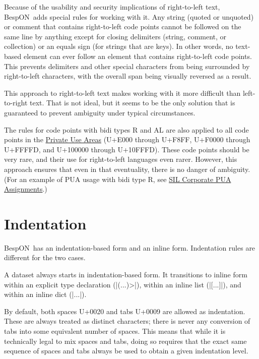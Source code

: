 \documentclass[11pt]{article}
\newcommand{\bespon}{BespON}
\begin{document}
Because of the usability and security implications of right-to-left text, \bespon\ adds special rules for working with it.  Any string (quoted or unquoted) or comment that contains right-to-left code points cannot be followed on the same line by anything except for closing delimiters (string, comment, or collection) or an equals sign (for strings that are keys).  In other words, no text-based element can ever follow an element that contains right-to-left code points.  This prevents delimiters and other special characters from being surrounded by right-to-left characters, with the overall span being visually reversed as a result.

This approach to right-to-left text makes working with it more difficult than left-to-right text.  That is not ideal, but it seems to be the only solution that is guaranteed to prevent ambiguity under typical circumstances.

The rules for code points with bidi types R and AL are also applied to all code points in the \href{http://www.unicode.org/faq/private_use.html}{Private Use Areas} (U+E000 through U+F8FF, U+F0000 through U+FFFFD, and U+100000 through  U+10FFFD).  These code points should be very rare, and their use for right-to-left languages even rarer.  However, this approach ensures that even in that eventuality, there is no danger of ambiguity.  (For an example of PUA usage with bidi type R, see \href{http://scripts.sil.org/cms/scripts/page.php?item_id=SILPUAassignments}{SIL Corporate PUA Assignments}.)







\section{Indentation}
\label{sec:indentation}

\bespon\ has an indentation-based form and an inline form.  Indentation rules are different for the two cases.

A dataset always starts in indentation-based form.  It transitions to inline form within an explicit type declaration (|(...)>|), within an inline list (|[...]|), and within an inline dict (|{...}|).

By default, both spaces U+0020 and tabs U+0009 are allowed as indentation.  These are always treated as distinct characters; there is never any conversion of tabs into some equivalent number of spaces.  This means that while it is technically legal to mix spaces and tabs, doing so requires that the exact same sequence of spaces and tabs always be used to obtain a given indentation level.
\end{document}
